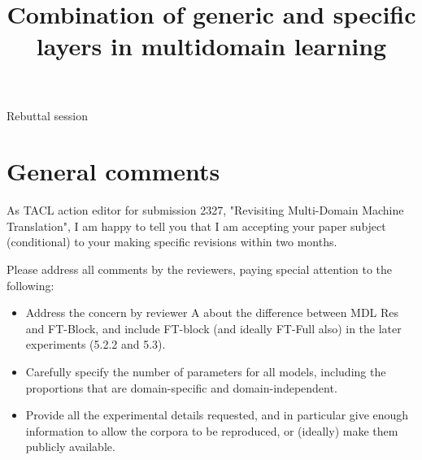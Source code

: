 \documentclass[12pt,times,a4paper,twoside]{article}
\title{Combination of generic and specific layers in multidomain learning}
\author{}
\date{}
\theoremstyle{definition}
\begin{document}
\maketitle
\begin{center}
{\LARGE \bf}Rebuttal session
\end{center}

\section*{General comments}
As TACL action editor for submission 2327, "Revisiting Multi-Domain Machine Translation", I am happy to tell you that I am accepting your paper subject (conditional) to your making specific revisions within two months.

Please address all comments by the reviewers, paying special attention to the following:
\begin{itemize}
	\item Address the concern by reviewer A about the difference between MDL Res and FT-Block, and include FT-block (and ideally FT-Full also) in the later experiments (5.2.2 and 5.3).
	\item Carefully specify the number of parameters for all models, including the proportions that are domain-specific and domain-independent.
	\item Provide all the experimental details requested, and in particular give enough information to allow the corpora to be reproduced, or (ideally) make them publicly available.
\end{itemize}
\end{document}
